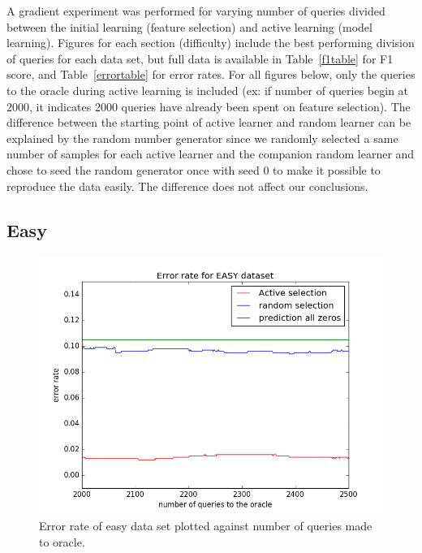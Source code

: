 \documentclass[paper=a4, fontsize=11pt]{scrartcl}
\numberwithin{equation}{section}    %
\numberwithin{figure}{section}      %
\numberwithin{table}{section}       %
\numberwithin{equation}{section}    %
\numberwithin{figure}{section}      %
\numberwithin{table}{section}       %
\begin{document}
A gradient experiment was performed for varying number of queries divided between the initial learning (feature selection) and active learning (model learning). Figures for each section (difficulty) include the best performing division of queries for each data set, but full data is available in Table~\ref{f1table} for F1 score, and Table~\ref{errortable} for error rates. For all figures below, only the queries to the oracle during active learning is included (ex: if number of queries begin at 2000, it indicates 2000 queries have already been spent on feature selection). The difference between the starting point of active learner and random learner can be explained by the random number generator since we randomly selected a same number of samples for each active learner and the companion random learner and chose to seed the random generator once with seed 0 to make it possible to reproduce the data easily. The difference does not affect our conclusions.

\subsection{Easy}


\begin{figure}[!htb]
  \centering
  \includegraphics[scale = 0.5]{figures/error_easy.png}
      \caption{Error rate of easy data set plotted against number of queries made to oracle.}
      \label{easyerror}
\end{figure}
\end{document}
